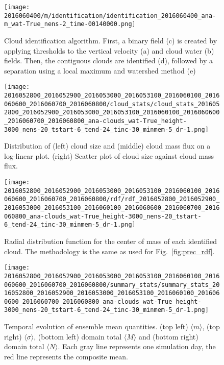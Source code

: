 \documentclass[a4paper, 12pt]{article}
\begin{document}
\begin{figure}[ht]
\noindent \centering
\texttt{[image: 2016060400/m/identification/identification\_2016060400\_ana-m\_wat-True\_nens-2\_time-00140000.png]}\\
\caption{Cloud identification algorithm. First, a binary field (c) is created by applying thresholds to the vertical velocity (a) and cloud water (b) fields. Then, the contiguous clouds are identified (d), followed by a separation using a local maximum and watershed method (e)} \label{fig:identification}
\end{figure}

\begin{figure}[ht]
\noindent \centering
\texttt{[image: 2016052800\_2016052900\_2016053000\_2016053100\_2016060100\_2016060600\_2016060700\_2016060800/cloud\_stats/cloud\_stats\_2016052800\_2016052900\_2016053000\_2016053100\_2016060100\_2016060600\_2016060700\_2016060800\_ana-clouds\_wat-True\_height-3000\_nens-20\_tstart-6\_tend-24\_tinc-30\_minmem-5\_dr-1.png]}\\
\caption{Distribution of (left) cloud size and (middle) cloud mass flux on a log-linear plot. (right) Scatter plot of cloud size against cloud mass flux. } \label{fig:cloud_stats}
\end{figure}

\begin{figure}[ht]
\noindent \centering
\texttt{[image: 2016052800\_2016052900\_2016053000\_2016053100\_2016060100\_2016060600\_2016060700\_2016060800/rdf/rdf\_2016052800\_2016052900\_2016053000\_2016053100\_2016060100\_2016060600\_2016060700\_2016060800\_ana-clouds\_wat-True\_height-3000\_nens-20\_tstart-6\_tend-24\_tinc-30\_minmem-5\_dr-1.png]}\\
\caption{Radial distribution function for the center of mass of each identified cloud. The methodology is the same as used for Fig.~\ref{fig:prec_rdf}.} \label{fig:rdf}
\end{figure}

\begin{figure}[ht]
\noindent \centering
\texttt{[image: 2016052800\_2016052900\_2016053000\_2016053100\_2016060100\_2016060600\_2016060700\_2016060800/summary\_stats/summary\_stats\_2016052800\_2016052900\_2016053000\_2016053100\_2016060100\_2016060600\_2016060700\_2016060800\_ana-clouds\_wat-True\_height-3000\_nens-20\_tstart-6\_tend-24\_tinc-30\_minmem-5\_dr-1.png]}\\
\caption{Temporal evolution of ensemble mean quantities. (top left) $\langle m \rangle$, (top right) $\langle \sigma \rangle$, (bottom left) domain total $\langle M \rangle$ and (bottom right) domain total $\langle N \rangle$. Each gray line represents one simulation day, the red line represents the composite mean.} \label{fig:summary_stats}
\end{figure}
\end{document}
